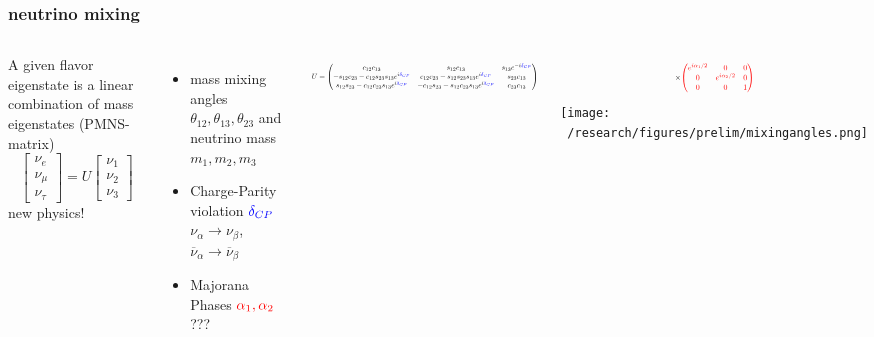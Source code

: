 \documentclass{beamer}
\begin{document}
	\begin{frame}
		\frametitle{neutrino mixing}
			\begin{columns}
			A given flavor eigenstate is a linear combination of mass eigenstates (PMNS-matrix)
			\begin{equation*}
			\begin{bmatrix}
			\nu_e \\
			\nu_{\mu} \\
			\nu_{\tau}
			\end{bmatrix}
			= U
			\begin{bmatrix}
			\nu_1 \\
			\nu_2 \\
			\nu_3
			\end{bmatrix}
			\end{equation*}			
			new physics!
			{\tiny
			\begin{itemize}
			 \item mass mixing angles $\theta_{12},\theta_{13},\theta_{23}$ and neutrino mass $m_1, m_2, m_3$
			 \item Charge-Parity violation $\textcolor{blue}{\delta_{CP}}$ $\nu_{\alpha}\rightarrow\nu_{\beta}$, $\overline{\nu}_{\alpha}\rightarrow\overline{\nu}_{\beta}$
			 \item Majorana Phases $\textcolor{red}{\alpha_1, \alpha_2}$ ???
			\end{itemize}
			}
			 
			\begin{equation*}		
			\resizebox{5.7cm}{!}{$U = \begin{pmatrix}
			c_{12}c_{13} & s_{12}c_{13} & s_{13}e^{-i\textcolor{blue}{\delta_{CP}}} \\
			-s_{12}c_{23}-c_{12}s_{23}s_{13}e^{i\textcolor{blue}{\delta_{CP}}} & c_{12}c_{23}-s_{12}s_{23}s_{13}e^{i\textcolor{blue}{\delta_{CP}}}
			& s_{23}c_{13} \\ s_{12}s_{23}-c_{12}c_{23}s_{13}e^{i\textcolor{blue}{\delta_{CP}}} & 
			-c_{12}s_{23}-s_{12}c_{23}s_{13}e^{i\textcolor{blue}{\delta_{CP}}} & c_{23}c_{13}
			\end{pmatrix}$}
			\end{equation*}
			
			\begin{equation*}
			\resizebox{2cm}{!}{$
			\times 
			\textcolor{red}{
			\begin{pmatrix}
			e^{i\alpha_1 /2} & 0 & 0 \\
			0 & e^{i\alpha_2 /2} & 0 \\
			0 & 0 & 1
			\end{pmatrix}}$}
			\end{equation*}
			\texttt{[image: ~/research/figures/prelim/mixingangles.png]}
			\end{columns}
	\end{frame}
	
\end{document}
